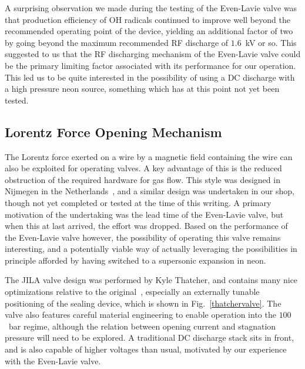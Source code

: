 A surprising observation we made during the testing of the Even-Lavie valve was that production efficiency of OH radicals continued to improve well beyond the recommended operating point of the device, yielding an additional factor of two by going beyond the maximum recommended RF discharge of $1.6$~kV or so.
This suggested to us that the RF discharging mechanism of the Even-Lavie valve could be the primary limiting factor associated with its performance for our operation.
This led us to be quite interested in the possibility of using a DC discharge with a high pressure neon source, something which has at this point not yet been tested.

\subsection{Lorentz Force Opening Mechanism}

The Lorentz force exerted on a wire by a magnetic field containing the wire can also be exploited for operating valves.
A key advantage of this is the reduced obstruction of the required hardware for gas flow.
This style was designed in Nijmegen in the Netherlands~\cite{Yan2013}, and a similar design was undertaken in our shop, though not yet completed or tested at the time of this writing.
A primary motivation of the undertaking was the lead time of the Even-Lavie valve, but when this at last arrived, the effort was dropped.
Based on the performance of the Even-Lavie valve however, the possibility of operating this valve remains interesting, and a potentially viable way of actually leveraging the possibilities in principle afforded by having switched to a supersonic expansion in neon.

The JILA valve design was performed by Kyle Thatcher, and contains many nice optimizations relative to the original~\cite{Yan2013}, especially an externally tunable positioning of the sealing device, which is shown in Fig.~\ref{thatchervalve}.
The valve also features careful material engineering to enable operation into the $100$~bar regime, although the relation between opening current and stagnation pressure will need to be explored.
A traditional DC discharge stack sits in front, and is also capable of higher voltages than usual, motivated by our experience with the Even-Lavie valve.

